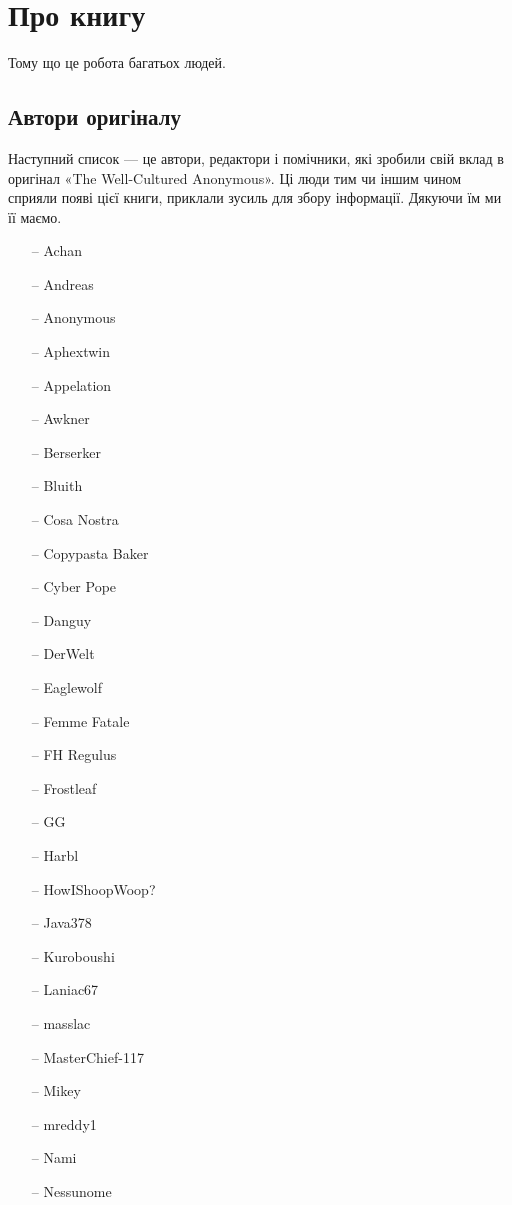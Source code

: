 \newpage
\tableofcontents

\chapter{Про книгу}
Тому що це робота багатьох людей.

\section{Автори оригіналу}
Наступний список — це автори, редактори і помічники, які зробили свій вклад
в оригінал «The Well-Cultured Anonymous». Ці люди тим чи іншим чином
сприяли появі цієї книги, приклали зусиль для збору інформації. Дякуючи їм
ми її маємо.

\begin{multicols}{3}
\begin{itemize}
	\item[--] Achan
	\item[--] Andreas
	\item[--] Anonymous
	\item[--] Aphextwin
	\item[--] Appelation
	\item[--] Awkner
	\item[--] Berserker
	\item[--] Bluith
	\item[--] Cosa Nostra
	\item[--] Copypasta Baker
	\item[--] Cyber Pope
	\item[--] Danguy
	\item[--] DerWelt
	\item[--] Eaglewolf
	\item[--] Femme Fatale
	\item[--] FH Regulus
	\item[--] Frostleaf
	\item[--] GG
	\item[--] Harbl
	\item[--] HowIShoopWoop?
	\item[--] Java378
	\item[--] Kuroboushi
	\item[--] Laniac67
	\item[--] masslac
	\item[--] MasterChief-117
	\item[--] Mikey
	\item[--] mreddy1
	\item[--] Nami
	\item[--] Nessunome

\end{itemize}
\end{multicols}
